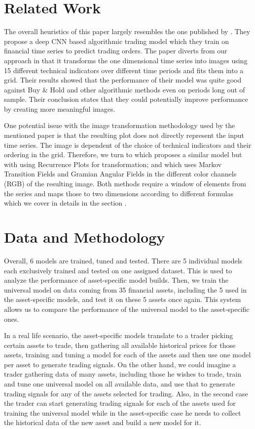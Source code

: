 \documentclass[11pt, a4paper]{article}
\begin{document}
\section{Related Work}
\label{sec:RelWork}

The overall heuristics of this paper largely resembles the one published by \cite{sezer2018algorithmic}. They propose a deep CNN based algorithmic trading model which they train on financial time series to predict trading orders. The paper diverts from our approach in that it transforms the one dimensional time series into images using 15 different technical indicators over different time periods and fits them into a grid. Their results showed that the performance of their model was quite good against Buy \& Hold and other algorithmic methods even on periods long out of sample. Their conclusion states that they could potentially improve performance by creating more meaningful images.

One potential issue with the image transformation methodology used by the mentioned paper is that the resulting plot does not directly represent the input time series. The image is dependent of the choice of technical indicators and their ordering in the grid. Therefore, we turn to \cite{hatami2018classification} which proposes a similar model but with using Recurrence Plots for transformation; and \cite{wang2015encoding} which uses Markov Transition Fields and Gramian Angular Fields in the different color channels (RGB) of the resulting image. Both methods require a window of elements from the series and maps those to two dimensions according to different formulas which we cover in details in the section .

\section{Data and Methodology}
Overall, 6 models are trained, tuned and tested. There are 5 individual models each exclusively trained and tested on one assigned dataset. This is used to analyze the performance of asset-specific model builds. 
Then, we train the universal model on data coming from 35 financial assets, including the 5 used in the asset-specific models, and test it on these 5 assets once again. This system allows us to compare the performance of the universal model to the asset-specific ones.

In a real life scenario, the asset-specific models translate to a trader picking certain assets to trade, then gathering all available historical prices for those assets, training and tuning a model for each of the assets and then use one model per asset to generate trading signals. 
On the other hand, we could imagine a trader gathering data of many assets, including those he wishes to trade, train and tune one universal model on all available data, and use that to generate trading signals for any of the assets selected for trading. Also, in the second case the trader can start generating trading signals for each of the assets used for training the universal model while in the asset-specific case he needs to collect the historical data of the new asset and build a new model for it.
\end{document}

